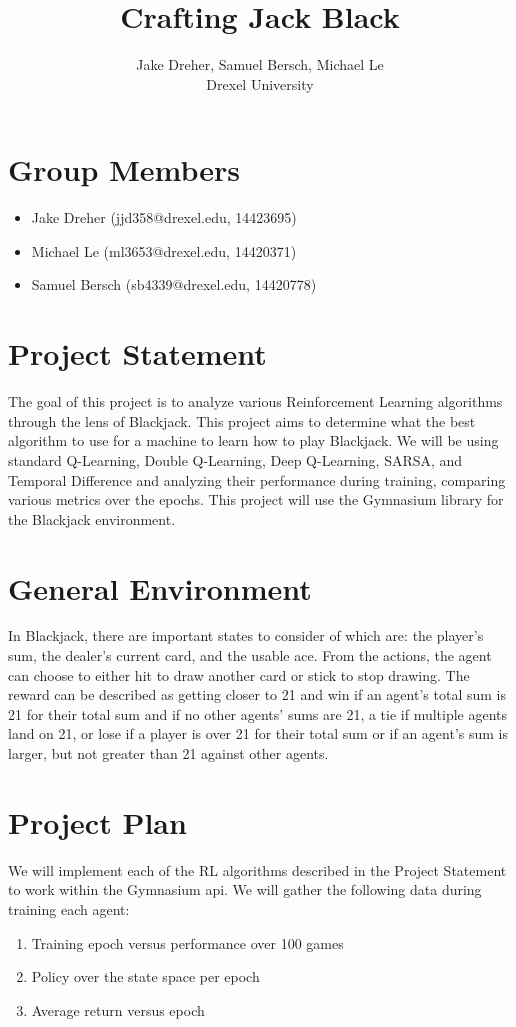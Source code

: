 \documentclass[letterpaper]{article}
\begin{document}
 \title{Crafting Jack Black}
\author{Jake Dreher, Samuel Bersch, Michael Le\\
Drexel University
}
\maketitle

 \section*{Group Members}
 \begin{itemize}
    \item Jake Dreher (jjd358@drexel.edu, 14423695)
    \item Michael Le (ml3653@drexel.edu, 14420371)
    \item Samuel Bersch (sb4339@drexel.edu, 14420778)
 \end{itemize}

 \section*{Project Statement}
 The goal of this project is to analyze various Reinforcement Learning algorithms through the lens of Blackjack. This project aims to determine what the best algorithm to use for a machine to learn how to play Blackjack. We will be using standard Q-Learning, Double Q-Learning, Deep Q-Learning, SARSA, and Temporal Difference and analyzing their performance during training, comparing various metrics over the epochs. This project will use the Gymnasium library for the Blackjack environment.

 \section*{General Environment}
 In Blackjack, there are important states to consider of which are: the player's sum, the dealer's current card, and the usable ace. From the actions, the agent can choose to either hit to draw another card or stick to stop drawing. The reward can be described as getting closer to 21 and win if an agent’s total sum is 21 for their total sum and if no other agents’ sums are 21, a tie if multiple agents land on 21, or lose if a player is over 21 for their total sum or if an agent's sum is larger, but not greater than 21 against other agents.

 \section*{Project Plan}
 We will implement each of the RL algorithms described in the Project Statement to work within the Gymnasium api. We will gather the following data during training each agent:
 \begin{enumerate}
     \item Training epoch versus performance over 100 games
     \item Policy over the state space per epoch
     \item Average return versus epoch
 \end{enumerate}
\end{document}

